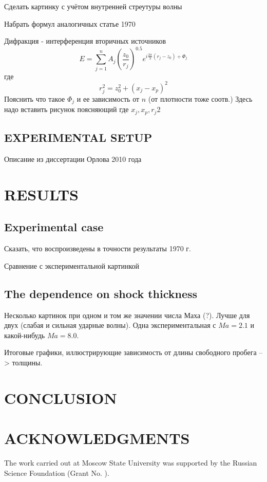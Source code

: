 \documentclass{aip-cp}
\begin{document}
Сделать картинку с учётом внутренней стреутуры волны

Набрать формул аналогичных статье 1970

Дифракция - интерференция вторичных источников
\begin{equation}
E = \sum_{j=1}^{n} A_j \left(\frac{z_0}{r_j} \right)^{0.5} e^{i \frac{2\pi}{\lambda} (r_j - z_0) + \Phi_j}
\end{equation}
где 
\begin{equation}
r_j^2= z_0^2 +( x_j - x_p)^2
\end{equation}
Пояснить что такое $\Phi_j$ и ее зависимость от $n$ (от плотности тоже соотв.)
Здесь надо вставить рисунок поясняющий где $x_j, x_p, r_j$2 
\subsection{EXPERIMENTAL SETUP}

Описание из диссертации Орлова 2010 года

\section{RESULTS}
\subsection{Experimental case}

Сказать, что воспроизведены в точности результаты 1970 г. 

Сравнение с экспериментальной картинкой 

\subsection{The dependence on shock thickness}

Несколько картинок при одном и том же значении числа Маха (?). Лучше для двух (слабая и сильная ударные волны). Одна экспериментальная с $Ma=2.1$ и какой-нибудь $Ma=8.0$.

Итоговые графики, иллюстрирующие зависимость от длины свободного пробега --> толщины.

\section{CONCLUSION}

\section{ACKNOWLEDGMENTS}
The work carried out at Moscow State University was supported by the Russian Science Foundation (Grant No. ).


\nocite{*}
%
%
\end{document}
